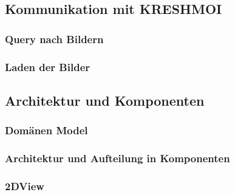\subsection{Kommunikation mit KRESHMOI}
\label{sec:Kommunikation mit KRESHMOI}

\subsubsection{Query nach Bildern}
\label{sec:Query nach Bildern}

\subsubsection{Laden der Bilder}
\label{sec:Laden der Bilder}


\subsection{Architektur und Komponenten}
\label{sec:Architektur und Komponenten}

\subsubsection{Domänen Model}
\label{sec:Domänen Model}

\subsubsection{Architektur und Aufteilung in Komponenten}
\label{sec:Architektur und Aufteilung in Komponenten}

\subsubsection{2DView}
\label{sec:2DView}

